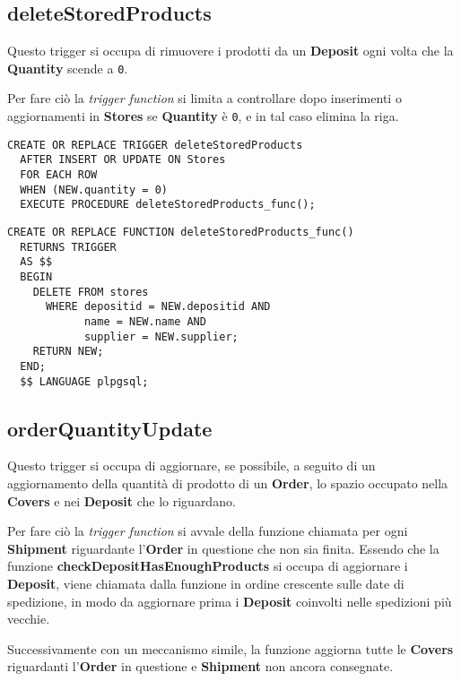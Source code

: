 \subsection{\textbf{deleteStoredProducts}}

Questo trigger si occupa di rimuovere i prodotti da un \textbf{Deposit} ogni volta che la \textbf{Quantity} scende a \lstinline{0}.

Per fare ciò la \textit{trigger function} si limita a controllare dopo inserimenti o aggiornamenti in \textbf{Stores} se \textbf{Quantity} è \lstinline{0}, e in tal caso elimina la riga.

\begin{lstlisting}[caption={Trigger per implementare \textbf{deleteStoredProducts}}]
  CREATE OR REPLACE TRIGGER deleteStoredProducts
  AFTER INSERT OR UPDATE ON Stores
  FOR EACH ROW
  WHEN (NEW.quantity = 0)
  EXECUTE PROCEDURE deleteStoredProducts_func();
\end{lstlisting}

\begin{lstlisting}[caption={Funzione \textbf{deleteStoredProducts}}]
  CREATE OR REPLACE FUNCTION deleteStoredProducts_func()
  RETURNS TRIGGER
  AS $$
  BEGIN
    DELETE FROM stores
      WHERE depositid = NEW.depositid AND
            name = NEW.name AND
            supplier = NEW.supplier;
    RETURN NEW;
  END;
  $$ LANGUAGE plpgsql;
\end{lstlisting}

\subsection{\textbf{orderQuantityUpdate}}

Questo trigger si occupa di aggiornare, se possibile, a seguito di un aggiornamento della quantità di prodotto di un \textbf{Order}, lo spazio occupato nella \textbf{Covers} e nei \textbf{Deposit} che lo riguardano.

Per fare ciò la \textit{trigger function} si avvale della funzione  chiamata per ogni \textbf{Shipment} riguardante l'\textbf{Order} in questione che non sia finita. Essendo che la funzione \textbf{checkDepositHasEnoughProducts} si occupa di aggiornare i \textbf{Deposit}, viene chiamata dalla funzione in ordine crescente sulle date di spedizione, in modo da aggiornare prima i \textbf{Deposit} coinvolti nelle spedizioni più vecchie.

Successivamente con un meccanismo simile, la funzione aggiorna tutte le \textbf{Covers} riguardanti l'\textbf{Order} in questione e \textbf{Shipment} non ancora consegnate.

